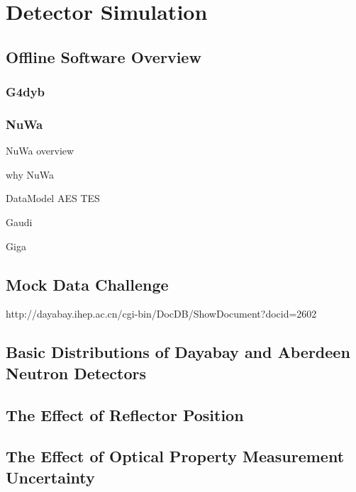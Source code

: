 \chapter {Detector Simulation}

\section {Offline Software Overview}

\subsection {G4dyb}

\subsection {NuWa}

NuWa overview

why NuWa

DataModel AES TES

Gaudi

Giga

\section {Mock Data Challenge}

http://dayabay.ihep.ac.cn/cgi-bin/DocDB/ShowDocument?docid=2602

\section {Basic Distributions of Dayabay and Aberdeen Neutron Detectors}

\section {The Effect of Reflector Position}

\section {The Effect of Optical Property Measurement Uncertainty}
